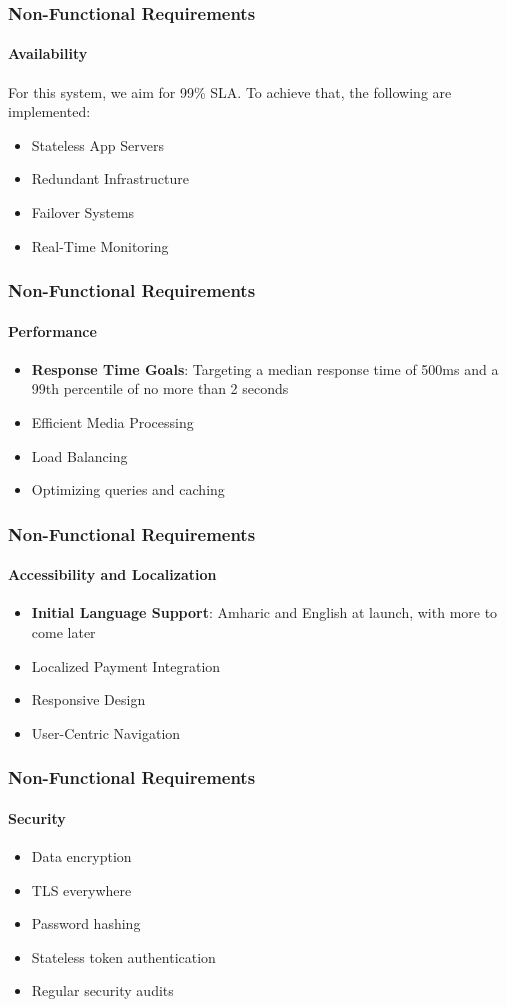 \documentclass{beamer}
\begin{document}
\begin{frame}
	\frametitle{Non-Functional Requirements}
	\framesubtitle{Availability}
	For this system, we aim for 99\% SLA\@. To achieve that, the following
	are implemented:
	\begin{itemize}
		\item Stateless App Servers
		\item Redundant Infrastructure
		\item Failover Systems
		\item Real-Time Monitoring
	\end{itemize}
\end{frame}

\begin{frame}
	\frametitle{Non-Functional Requirements}
	\framesubtitle{Performance}
	\begin{itemize}
		\item \textbf{Response Time Goals}: Targeting a median response time of 500ms and a 99th
		      percentile of no more than 2 seconds
		\item Efficient Media Processing
		\item Load Balancing
		\item Optimizing queries and caching
	\end{itemize}
\end{frame}

\begin{frame}
	\frametitle{Non-Functional Requirements}
	\framesubtitle{Accessibility and Localization}
	\begin{itemize}
		\item \textbf{Initial Language Support}: Amharic and English at launch,
		      with more to come later
		\item Localized Payment Integration
		\item Responsive Design
		\item User-Centric Navigation
	\end{itemize}
\end{frame}

\begin{frame}
	\frametitle{Non-Functional Requirements}
	\framesubtitle{Security}
	\begin{itemize}
		\item Data encryption
		\item TLS everywhere
		\item Password hashing
		\item Stateless token authentication
		\item Regular security audits
	\end{itemize}
\end{frame}
\end{document}
